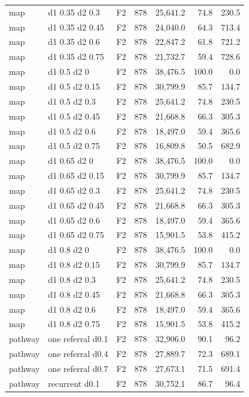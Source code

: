 \begin{longtable}{p{1.8cm}p{3.35cm}lrrrr}
map & d1 0.35 d2 0.3 & F2 & 878 & 25,641.2 & 74.8 & 230.5\\
map & d1 0.35 d2 0.45 & F2 & 878 & 24,040.0 & 64.3 & 713.4\\
map & d1 0.35 d2 0.6 & F2 & 878 & 22,847.2 & 61.8 & 721.2\\
map & d1 0.35 d2 0.75 & F2 & 878 & 21,732.7 & 59.4 & 728.6\\
map & d1 0.5 d2 0 & F2 & 878 & 38,476.5 & 100.0 & 0.0\\
map & d1 0.5 d2 0.15 & F2 & 878 & 30,799.9 & 85.7 & 134.7\\
map & d1 0.5 d2 0.3 & F2 & 878 & 25,641.2 & 74.8 & 230.5\\
map & d1 0.5 d2 0.45 & F2 & 878 & 21,668.8 & 66.3 & 305.3\\
map & d1 0.5 d2 0.6 & F2 & 878 & 18,497.0 & 59.4 & 365.6\\
map & d1 0.5 d2 0.75 & F2 & 878 & 16,809.8 & 50.5 & 682.9\\
map & d1 0.65 d2 0 & F2 & 878 & 38,476.5 & 100.0 & 0.0\\
map & d1 0.65 d2 0.15 & F2 & 878 & 30,799.9 & 85.7 & 134.7\\
map & d1 0.65 d2 0.3 & F2 & 878 & 25,641.2 & 74.8 & 230.5\\
map & d1 0.65 d2 0.45 & F2 & 878 & 21,668.8 & 66.3 & 305.3\\
map & d1 0.65 d2 0.6 & F2 & 878 & 18,497.0 & 59.4 & 365.6\\
map & d1 0.65 d2 0.75 & F2 & 878 & 15,901.5 & 53.8 & 415.2\\
map & d1 0.8 d2 0 & F2 & 878 & 38,476.5 & 100.0 & 0.0\\
map & d1 0.8 d2 0.15 & F2 & 878 & 30,799.9 & 85.7 & 134.7\\
map & d1 0.8 d2 0.3 & F2 & 878 & 25,641.2 & 74.8 & 230.5\\
map & d1 0.8 d2 0.45 & F2 & 878 & 21,668.8 & 66.3 & 305.3\\
map & d1 0.8 d2 0.6 & F2 & 878 & 18,497.0 & 59.4 & 365.6\\
map & d1 0.8 d2 0.75 & F2 & 878 & 15,901.5 & 53.8 & 415.2\\
pathway & one referral d0.1 & F2 & 878 & 32,906.0 & 90.1 & 96.2\\
pathway & one referral d0.4 & F2 & 878 & 27,889.7 & 72.3 & 689.1\\
pathway & one referral d0.7 & F2 & 878 & 27,673.1 & 71.5 & 691.4\\
pathway & recurrent d0.1 & F2 & 878 & 30,752.1 & 86.7 & 96.4\\

\end{longtable}
